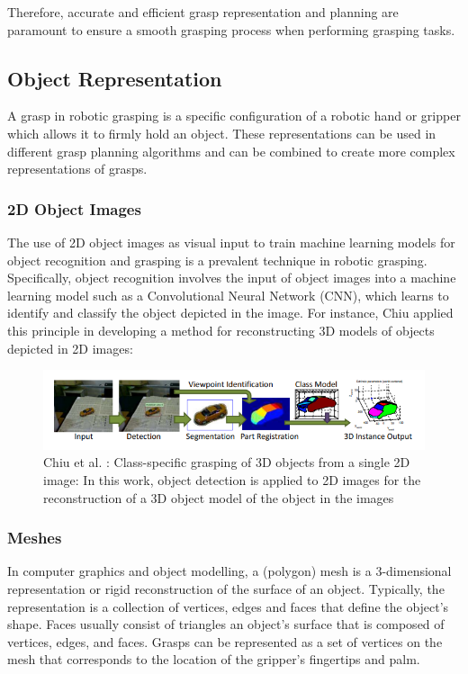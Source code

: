 \documentclass[11pt, a4paper]{report}
\begin{document}
Therefore, accurate and efficient grasp representation and planning are paramount to ensure a smooth grasping process when performing grasping tasks.


\newpage
\subsection{Object Representation}\label{sec:2.1.1}
A grasp in robotic grasping is a specific configuration of a robotic hand or gripper which allows it to firmly hold an object. These representations can be used in different grasp planning algorithms and can be combined to create more complex representations of grasps.

\subsubsection{2D Object Images}\label{sec:2.1.1.1}
The use of 2D object images as visual input to train machine learning models for object recognition and grasping is a prevalent technique in robotic grasping. Specifically, object recognition involves the input of object images into a machine learning model such as a Convolutional Neural Network (CNN), which learns to identify and classify the object depicted in the image. For instance, Chiu \cite{5652597} applied this principle in developing a method for reconstructing 3D models of objects depicted in 2D images:
\begin{figure}[H]
    \centering
    \includegraphics[width=\textwidth]{docs/Project Report/Media/2_1_1_object_detection.png}
    \caption{Chiu et al. \cite{5652597}: Class-specific grasping of 3D objects from a single 2D image: In this work, object detection is applied to 2D images for the reconstruction of a 3D object model of the object in the images}
    \label{fig:2.1}
\end{figure}

\subsubsection{Meshes}\label{sec:2.1.1.2}
In computer graphics and object modelling, a (polygon) mesh is a 3-dimensional representation or rigid reconstruction of the surface of an object. Typically, the representation is a collection of vertices, edges and faces that define the object's shape. Faces usually consist of triangles an object's surface that is composed of vertices, edges, and faces. Grasps can be represented as a set of vertices on the mesh that corresponds to the location of the gripper's fingertips and palm.
\end{document}

